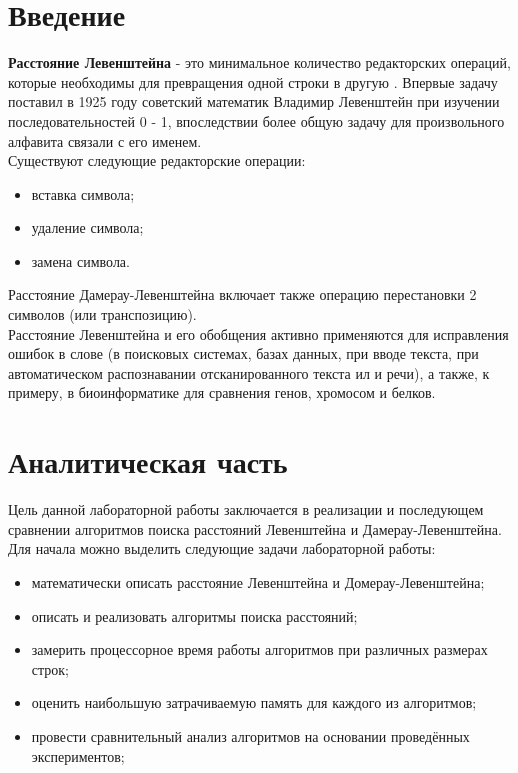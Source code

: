 \documentclass[12pt,a4paper]{report}
\begin{document}

\tableofcontents

\newpage
\chapter*{Введение}
\textbf{Расстояние Левенштейна} - это минимальное количество редакторских операций, которые необходимы 
для превращения одной строки в другую \cite{lev_info}. Впервые задачу поставил в 1925 году советский математик Владимир 
Левенштейн при изучении последовательностей 0 - 1, впоследствии более общую задачу для произвольного 
алфавита связали с его именем.\\

Существуют следующие редакторские операции:
\begin{itemize}
    \item вставка символа;
    \item удаление символа;
    \item замена символа.
\end{itemize} 

Расстояние Дамерау-Левенштейна включает также операцию перестановки 2 символов (или транспозицию).\\

Расстояние Левенштейна и его обобщения активно применяются для исправления ошибок в слове (в поисковых
 системах, базах данных, при вводе текста, при автоматическом распознавании отсканированного текста ил
и речи), а также, к примеру, в биоинформатике для сравнения генов, хромосом и белков.

\newpage
\chapter{Аналитическая часть}
Цель данной лабораторной работы заключается в реализации и последующем сравнении алгоритмов поиска 
расстояний Левенштейна и Дамерау-Левенштейна.\\

Для начала можно выделить следующие задачи лабораторной работы:
\begin{itemize}
    \item математически описать расстояние Левенштейна и Домерау-Левенштейна;
    \item описать и реализовать алгоритмы поиска расстояний;
    \item замерить процессорное время работы алгоритмов при различных размерах строк;
    \item оценить наибольшую затрачиваемую память для каждого из алгоритмов;
    \item провести сравнительный анализ алгоритмов на основании проведённых экспериментов; 
\end{itemize}
\end{document}
